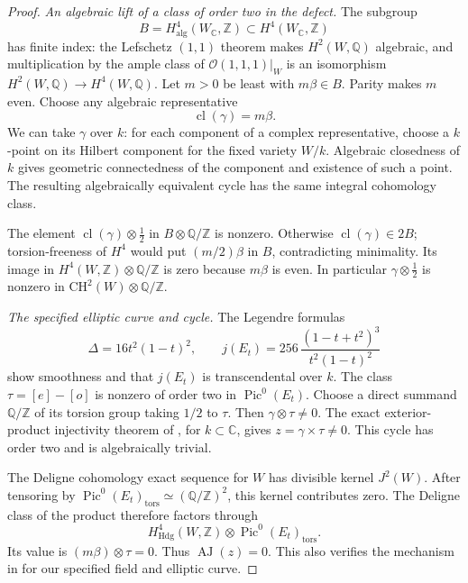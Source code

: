 \begin{proof}
\emph{An algebraic lift of a class of order two in the defect.}
The subgroup
\[
 B=H^4_{\mathrm{alg}}(W_{\mathbb C},\mathbb Z)
       \subset H^4(W_{\mathbb C},\mathbb Z)
\]
has finite index: the Lefschetz $(1,1)$ theorem makes
$H^2(W,\mathbb Q)$ algebraic, and multiplication by the ample
class of $\mathcal O(1,1,1)|_W$ is an isomorphism
$H^2(W,\mathbb Q)\to H^4(W,\mathbb Q)$.
Let $m>0$ be least with $m\beta\in B$. Parity makes $m$ even.
Choose any algebraic representative
\[
             \operatorname{cl}(\gamma)=m\beta .
\]
We can take $\gamma$ over $k$: for each component of a complex
representative, choose a $k$-point on its Hilbert component for
the fixed variety $W/k$. Algebraic closedness of $k$ gives
geometric connectedness of the component and existence of such
a point. The resulting algebraically equivalent cycle has the
same integral cohomology class.

The element $\operatorname{cl}(\gamma)\otimes\tfrac12$ in
$B\otimes\mathbb Q/\mathbb Z$ is nonzero. Otherwise
$\operatorname{cl}(\gamma)\in2B$; torsion-freeness of $H^4$
would put $(m/2)\beta$ in $B$, contradicting minimality.
Its image in $H^4(W,\mathbb Z)\otimes\mathbb Q/\mathbb Z$ is
zero because $m\beta$ is even. In particular
$\gamma\otimes\tfrac12$ is nonzero in
$\mathrm{CH}^2(W)\otimes\mathbb Q/\mathbb Z$.

\emph{The specified elliptic curve and cycle.}
The Legendre formulas
\[
 \Delta=16t^2(1-t)^2,\qquad
 j(E_t)=256\,\frac{(1-t+t^2)^3}{t^2(1-t)^2}
\]
show smoothness and that $j(E_t)$ is transcendental over $k$.
The class $\tau=[e]-[o]$ is nonzero of order two in
$\operatorname{Pic}^0(E_t)$. Choose a direct summand
$\mathbb Q/\mathbb Z$ of its torsion group taking $1/2$ to $\tau$.
Then $\gamma\otimes\tau\ne0$.
The exact exterior-product injectivity theorem of
\citet[Theorem (0.2), p.~177]{cySchoen2000Exterior}, for
$k\subset\mathbb C$, gives $z=\gamma\times\tau\ne0$.
This cycle has order two and is algebraically trivial.

The Deligne cohomology exact sequence for $W$ has divisible
kernel $J^2(W)$. After tensoring by
$\operatorname{Pic}^0(E_t)_{\mathrm{tors}}\simeq
(\mathbb Q/\mathbb Z)^2$, this kernel contributes zero.
The Deligne class of the product therefore factors through
\[
 H^4_{\mathrm{Hdg}}(W,\mathbb Z)
          \otimes\operatorname{Pic}^0(E_t)_{\mathrm{tors}}.
\]
Its value is $(m\beta)\otimes\tau=0$.
Thus $\operatorname{AJ}(z)=0$. This also verifies the mechanism
in \citet[Proposition 3.1 and proof, author pp.~5--6]
{cySuzuki2020Remark} for our specified field and elliptic curve.


\end{proof}
